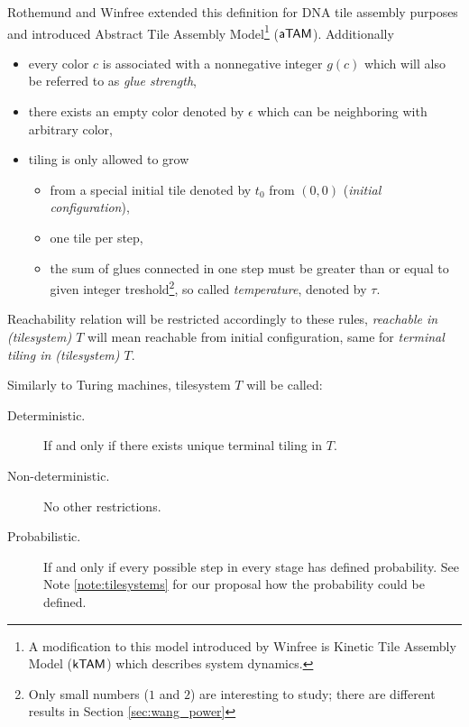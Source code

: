 	Rothemund and Winfree \cite{square_lb} extended this definition for DNA tile assembly purposes and introduced Abstract Tile Assembly Model\footnote{A modification to this model introduced by Winfree is Kinetic Tile Assembly Model ($\mathsf{kTAM}$) which describes system dynamics.} ($\mathsf{aTAM}$). Additionally
	\begin{itemize}
		\item every color $c$ is associated with a nonnegative integer $g(c)$ which will also be referred to as {\em glue strength},
		\item there exists an empty color denoted by $\epsilon$ which can be neighboring with arbitrary color,
		\item tiling is only allowed to grow
		\begin{itemize}
			\item from a special initial tile denoted by $t_0$ from $(0,0)$ ({\em initial configuration}),
			\item one tile per step,
			\item the sum of glues connected in one step must be greater than or equal to given integer treshold\footnote{Only small numbers ($1$ and $2$) are interesting to study; there are different results in Section \ref{sec:wang_power}}, so called {\em temperature}, denoted by $\tau$.
		\end{itemize}
	\end{itemize}
	Reachability relation will be restricted accordingly to these rules, {\em reachable in (tilesystem) $T$} will mean reachable from initial configuration, same for {\em terminal tiling in (tilesystem) $T$}.
	
	Similarly to Turing machines, tilesystem $T$ will be called:
	\begin{description}
		\item[Deterministic.] If and only if there exists unique terminal tiling in $T$. %
		\item[Non-deterministic.] No other restrictions.
		\item[Probabilistic.] If and only if every possible step in every stage has defined probability. See Note \ref{note:tilesystems} for our proposal how the probability could be defined.
	\end{description}
	

